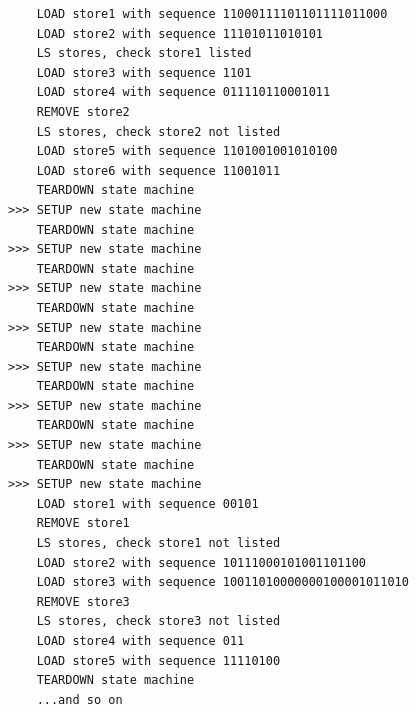 \documentclass[11pt]{article}
\begin{document}
{\begin{verbatim}
    LOAD store1 with sequence 11000111101101111011000
    LOAD store2 with sequence 11101011010101
    LS stores, check store1 listed
    LOAD store3 with sequence 1101
    LOAD store4 with sequence 011110110001011
    REMOVE store2
    LS stores, check store2 not listed
    LOAD store5 with sequence 1101001001010100
    LOAD store6 with sequence 11001011
    TEARDOWN state machine
>>> SETUP new state machine
    TEARDOWN state machine
>>> SETUP new state machine
    TEARDOWN state machine
>>> SETUP new state machine
    TEARDOWN state machine
>>> SETUP new state machine
    TEARDOWN state machine
>>> SETUP new state machine
    TEARDOWN state machine
>>> SETUP new state machine
    TEARDOWN state machine
>>> SETUP new state machine
    TEARDOWN state machine
>>> SETUP new state machine
    LOAD store1 with sequence 00101
    REMOVE store1
    LS stores, check store1 not listed
    LOAD store2 with sequence 10111000101001101100
    LOAD store3 with sequence 10011010000000100001011010
    REMOVE store3
    LS stores, check store3 not listed
    LOAD store4 with sequence 011
    LOAD store5 with sequence 11110100
    TEARDOWN state machine
    ...and so on
\end{verbatim}}
\end{document}

